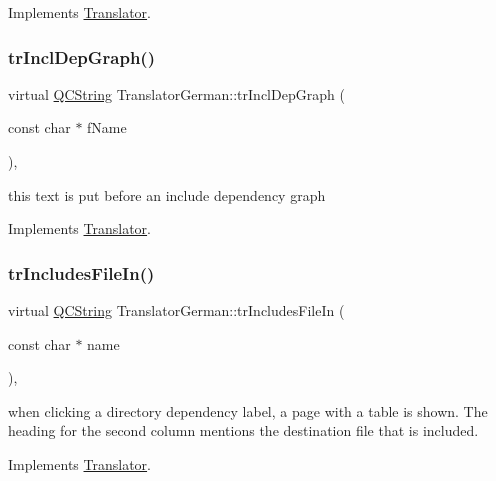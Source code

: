 Implements \mbox{\hyperlink{class_translator}{Translator}}.

\mbox{\label{class_translator_german_aaf6437dda846b846b8310d73c83ab8af}} 
\subsubsection{\texorpdfstring{trInclDepGraph()}{trInclDepGraph()}}
{\footnotesize\ttfamily virtual \mbox{\hyperlink{class_q_c_string}{Q\+C\+String}} Translator\+German\+::tr\+Incl\+Dep\+Graph (\begin{DoxyParamCaption}\item[{const char $\ast$}]{f\+Name }\end{DoxyParamCaption})\hspace{0.3cm}{\ttfamily [inline]}, {\ttfamily [virtual]}}

this text is put before an include dependency graph 

Implements \mbox{\hyperlink{class_translator}{Translator}}.

\mbox{\label{class_translator_german_a98a9d1fbee548039b81bf697cff4519e}} 
\subsubsection{\texorpdfstring{trIncludesFileIn()}{trIncludesFileIn()}}
{\footnotesize\ttfamily virtual \mbox{\hyperlink{class_q_c_string}{Q\+C\+String}} Translator\+German\+::tr\+Includes\+File\+In (\begin{DoxyParamCaption}\item[{const char $\ast$}]{name }\end{DoxyParamCaption})\hspace{0.3cm}{\ttfamily [inline]}, {\ttfamily [virtual]}}

when clicking a directory dependency label, a page with a table is shown. The heading for the second column mentions the destination file that is included. 

Implements \mbox{\hyperlink{class_translator}{Translator}}.

\mbox{\label{class_translator_german_aa5de02d46aa81f2c36178e82089ce9b7}} 
